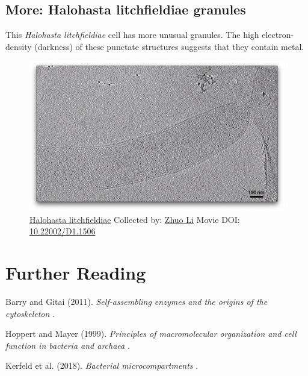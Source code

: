 \documentclass[]{tufte-book}
\begin{document}
\hypertarget{Halohasta_litchfieldiae_granules}{\subsection*{More:
Halohasta litchfieldiae
granules}\label{Halohasta_litchfieldiae_granules}}

This \emph{Halohasta litchfieldiae} cell has more unusual granules. The
high electron-density (darkness) of these punctate structures suggests
that they contain metal.





\begin{figure}
\includegraphics{movie_stills/4_10b} \caption[\protect\hyperlink{tree}{Halohasta litchfieldiae} Collected
by: \protect\hyperlink{zhuo_li}{Zhuo Li} Movie DOI:
\href{https://doi.org/10.22002/D1.1506}{10.22002/D1.1506}]{\protect\hyperlink{tree}{Halohasta litchfieldiae} Collected
by: \protect\hyperlink{zhuo_li}{Zhuo Li} Movie DOI:
\href{https://doi.org/10.22002/D1.1506}{10.22002/D1.1506}}\label{fig:4-10b}
\end{figure}

\section{Further Reading}\label{further-reading}

Barry and Gitai (2011). \emph{Self-assembling enzymes and the origins of
the cytoskeleton} \citep{barry2011}.

Hoppert and Mayer (1999). \emph{Principles of macromolecular
organization and cell function in bacteria and archaea}
\citep{hoppert1999}.

Kerfeld et al. (2018). \emph{Bacterial microcompartments}
\citep{kerfeld2018}.
\end{document}

